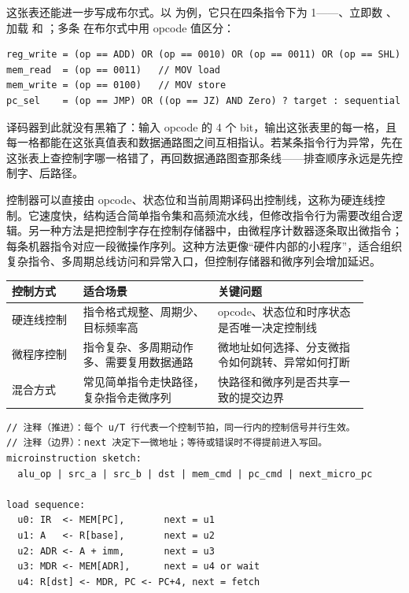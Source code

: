 这张表还能进一步写成布尔式。以  为例，它只在四条指令下为 1——、立即数 、加载  和 ；多条  在布尔式中用 opcode 值区分：

\begin{lstlisting}
reg_write = (op == ADD) OR (op == 0010) OR (op == 0011) OR (op == SHL)
mem_read  = (op == 0011)   // MOV load
mem_write = (op == 0100)   // MOV store
pc_sel    = (op == JMP) OR ((op == JZ) AND Zero) ? target : sequential
\end{lstlisting}

译码器到此就没有黑箱了：输入 opcode 的 4 个 bit，输出这张表里的每一格，且每一格都能在这张真值表和数据通路图之间互相指认。若某条指令行为异常，先在这张表上查控制字哪一格错了，再回数据通路图查那条线——排查顺序永远是先控制字、后路径。

控制器可以直接由 opcode、状态位和当前周期译码出控制线，这称为硬连线控制。它速度快，结构适合简单指令集和高频流水线，但修改指令行为需要改组合逻辑。另一种方法是把控制字存在控制存储器中，由微程序计数器逐条取出微指令；每条机器指令对应一段微操作序列。这种方法更像“硬件内部的小程序”，适合组织复杂指令、多周期总线访问和异常入口，但控制存储器和微序列会增加延迟。

\begin{longtable}{L{0.18\linewidth}L{0.34\linewidth}L{0.38\linewidth}}
\toprule
控制方式 & 适合场景 & 关键问题 \\
\midrule
硬连线控制 & 指令格式规整、周期少、目标频率高 & opcode、状态位和时序状态是否唯一决定控制线 \\\tablerowrule
微程序控制 & 指令复杂、多周期动作多、需要复用数据通路 & 微地址如何选择、分支微指令如何跳转、异常如何打断 \\\tablerowrule
混合方式 & 常见简单指令走快路径，复杂指令走微序列 & 快路径和微序列是否共享一致的提交边界 \\
\bottomrule
\end{longtable}

\begin{lstlisting}
// 注释（推进）：每个 u/T 行代表一个控制节拍，同一行内的控制信号并行生效。
// 注释（边界）：next 决定下一微地址；等待或错误时不得提前进入写回。
microinstruction sketch:
  alu_op | src_a | src_b | dst | mem_cmd | pc_cmd | next_micro_pc

load sequence:
  u0: IR  <- MEM[PC],       next = u1
  u1: A   <- R[base],       next = u2
  u2: ADR <- A + imm,       next = u3
  u3: MDR <- MEM[ADR],      next = u4 or wait
  u4: R[dst] <- MDR, PC <- PC+4, next = fetch
\end{lstlisting}

